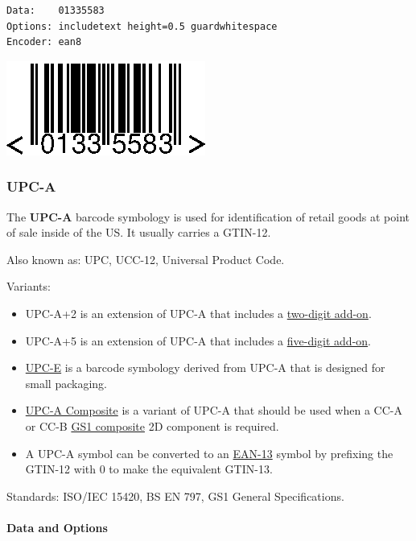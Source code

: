 \begin{verbatim}
Data:    01335583
Options: includetext height=0.5 guardwhitespace
Encoder: ean8
\end{verbatim}

\includegraphics{images/ean8-2.eps}

\hypertarget{upc-a}{%
\subsubsection{UPC-A}\label{upc-a}}

The \textbf{UPC-A} barcode symbology is used for identification of
retail goods at point of sale inside of the US. It usually carries a
GTIN-12.

Also known as: UPC, UCC-12, Universal Product Code.

Variants:

\begin{itemize}
\tightlist
\item
  UPC-A+2 is an extension of UPC-A that includes a
  \protect\hyperlink{ean-2}{two-digit add-on}.
\item
  UPC-A+5 is an extension of UPC-A that includes a
  \protect\hyperlink{ean-5}{five-digit add-on}.
\item
  \protect\hyperlink{upc-e}{UPC-E} is a barcode symbology derived from
  UPC-A that is designed for small packaging.
\item
  \protect\hyperlink{gs1-composite-symbols}{UPC-A Composite} is a
  variant of UPC-A that should be used when a CC-A or CC-B
  \protect\hyperlink{gs1-composite-symbols}{GS1 composite} 2D component
  is required.
\item
  A UPC-A symbol can be converted to an
  \protect\hyperlink{ean-13}{EAN-13} symbol by prefixing the GTIN-12
  with 0 to make the equivalent GTIN-13.
\end{itemize}

Standards: ISO/IEC 15420, BS EN 797, GS1 General Specifications.

\hypertarget{data-and-options-2}{%
\paragraph{Data and Options}\label{data-and-options-2}}


